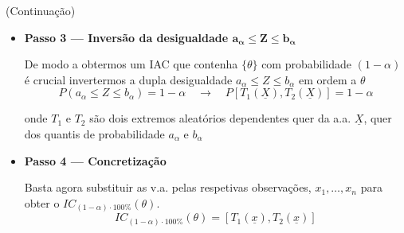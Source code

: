 {

\begin{mdframed}
    \noindent (Continuação)
    \begin{itemize}
         \item \textbf{Passo 3 --- Inversão da desigualdade $\mathbf{a_\alpha \leq Z \leq b_\alpha}$}

         De modo a obtermos um IAC que contenha $\{\theta\}$ com probabilidade $(1 - \alpha)$ é crucial invertermos a dupla desigualdade $a_\alpha \leq Z \leq b_\alpha$ em ordem a $\theta$
         $$
            P(a_\alpha \leq Z \leq b_\alpha) = 1 - \alpha
            \quad\rightarrow\quad
            P[T_1(\underline{X}), T_2(\underline{X})] = 1 - \alpha
         $$

         \noindent onde $T_1$ e $T_2$ são dois extremos aleatórios dependentes quer da a.a. $\underline{X}$, quer dos quantis de probabilidade $a_\alpha$ e $b_\alpha$
         
        \item \textbf{Passo 4 --- Concretização}

        \noindent Basta agora substituir as v.a. pelas respetivas observações, $x_1,\dots,x_n$ para obter o $IC_{(1 - \alpha) \cdot 100 \%}(\theta)$.
        $$
            IC_{(1 - \alpha) \cdot 100 \%}(\theta) = [T_1(\underline{x}), T_2(\underline{x})]
        $$
    \end{itemize}
\end{mdframed}
}
